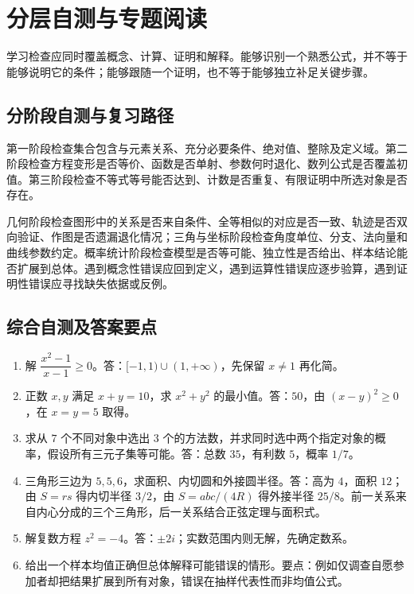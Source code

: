 \setcounter{chapter}{1} %
\chapter{分层自测与专题阅读}
\label{app:em-study}
学习检查应同时覆盖概念、计算、证明和解释。能够识别一个熟悉公式，并不等于能够说明它的条件；能够跟随一个证明，也不等于能够独立补足关键步骤。

\section{分阶段自测与复习路径}
第一阶段检查集合包含与元素关系、充分必要条件、绝对值、整除及定义域。第二阶段检查方程变形是否等价、函数是否单射、参数何时退化、数列公式是否覆盖初值。第三阶段检查不等式等号能否达到、计数是否重复、有限证明中所选对象是否存在。

几何阶段检查图形中的关系是否来自条件、全等相似的对应是否一致、轨迹是否双向验证、作图是否遗漏退化情况；三角与坐标阶段检查角度单位、分支、法向量和曲线参数约定。概率统计阶段检查模型是否等可能、独立性是否给出、样本结论能否扩展到总体。遇到概念性错误应回到定义，遇到运算性错误应逐步验算，遇到证明性错误应寻找缺失依据或反例。

\section{综合自测及答案要点}
\begin{enumerate}
\item 解 $\dfrac{x^2-1}{x-1}\ge0$。答：$[-1,1)\cup(1,+\infty)$，先保留 $x\ne1$ 再化简。
\item 正数 $x,y$ 满足 $x+y=10$，求 $x^2+y^2$ 的最小值。答：$50$，由 $(x-y)^2\ge0$，在 $x=y=5$ 取得。
\item 求从 $7$ 个不同对象中选出 $3$ 个的方法数，并求同时选中两个指定对象的概率，假设所有三元子集等可能。答：总数 $35$，有利数 $5$，概率 $1/7$。
\item 三角形三边为 $5,5,6$，求面积、内切圆和外接圆半径。答：高为 $4$，面积 $12$；由 $S=rs$ 得内切半径 $3/2$，由 $S=abc/(4R)$ 得外接半径 $25/8$。前一关系来自内心分成的三个三角形，后一关系结合正弦定理与面积式。
\item 解复数方程 $z^2=-4$。答：$\pm2i$；实数范围内则无解，先确定数系。
\item 给出一个样本均值正确但总体解释可能错误的情形。要点：例如仅调查自愿参加者却把结果扩展到所有对象，错误在抽样代表性而非均值公式。
\end{enumerate}

